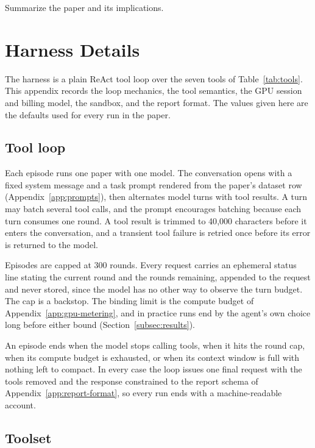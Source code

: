 \documentclass{article} %
\begin{document}
Summarize the paper and its implications.




\appendix

\section{Harness Details}
\label{app:harness}

The harness is a plain ReAct tool loop over the seven tools of
Table~\ref{tab:tools}. This appendix records the loop mechanics, the tool semantics, the
GPU session and billing model, the sandbox, and the report format. The values given here are the defaults used for every run in
the paper.

\subsection{Tool loop}
\label{app:tool-loop}

Each episode runs one paper with one model. The conversation opens with a
fixed system message and a task prompt rendered from the paper's dataset row
(Appendix~\ref{app:prompts}), then alternates model turns with tool results.
A turn may batch several tool calls, and the prompt encourages batching
because each turn consumes one round. A tool result is trimmed to 40{,}000
characters before it enters the conversation, and a transient tool failure
is retried once before its error is returned to the model.

Episodes are capped at 300 rounds. Every request carries an ephemeral status
line stating the current round and the rounds remaining, appended to the
request and never stored, since the model has no other way to observe the
turn budget. The cap is a backstop. The binding limit is the compute budget
of Appendix~\ref{app:gpu-metering}, and in practice runs end by the agent's
own choice long before either bound (Section~\ref{subsec:results}).

An episode ends when the model stops calling tools, when it hits the round
cap, when its compute budget is exhausted, or when its context window is
full with nothing left to compact. In every
case the loop issues one final request with the tools removed and the
response constrained to the report schema of
Appendix~\ref{app:report-format}, so every run ends with a machine-readable
account.

\subsection{Toolset}
\label{app:toolset}
\end{document}
